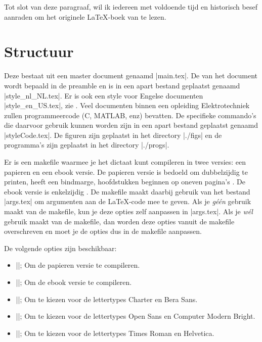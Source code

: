 Tot slot van deze paragraaf, wil ik iedereen met voldoende tijd en historisch besef aanraden om het originele \LaTeX{}-boek  van \citeauthor{latex} \cite{latex} te lezen.

\section{Structuur}
Deze \MakeLowercase\documenttype{} bestaat uit een master document genaamd |main.tex|.
De  van het document wordt bepaald in de preamble en is in een apart bestand geplaatst genaamd |style_nl_NL.tex|.
Er is ook een style voor Engelse documenten |style_en_US.tex|, zie .
Veel documenten binnen een opleiding Elektrotechniek zullen programmeercode (C, MATLAB, enz) bevatten.
De specifieke commando's die daarvoor gebruik kunnen worden zijn in een apart bestand geplaatst genaamd |styleCode.tex|.
De figuren zijn geplaatst in het directory |./figs| en de programma's zijn geplaatst in het directory |./progs|.

Er is een makefile waarmee je het dictaat kunt compileren in twee versies: een papieren en een ebook versie.
De papieren versie is bedoeld om dubbelzijdig te printen, heeft een bindmarge, hoofdstukken beginnen op oneven pagina's%
.
De ebook versie is enkelzijdig%
.
De makefile maakt daarbij gebruik van het bestand |args.tex| om argumenten aan de \LaTeX\hyp{}code mee te geven.
Als je \emph{géén} gebruik maakt van de makefile, kun je deze opties zelf aanpassen in |args.tex|.
Als je \emph{wél} gebruik maakt van de makefile, dan worden deze opties vanuit de makefile overschreven en moet je de opties dus in de makefile aanpassen.

De volgende opties zijn beschikbaar:
\begin{itemize}
    \item |\ebookfalse|; Om de papieren versie te compileren.
    \item |\ebooktrue|; Om de ebook versie te compileren.
    \item |\chartertrue|; Om te kiezen voor de lettertypes Charter en Bera Sans.
    \item |\opensanstrue|; Om te kiezen voor de lettertypes Open Sans en Computer Modern Bright.
    \item |\timestrue|; Om te kiezen voor de lettertypes Times Roman en Helvetica.
\end{itemize}

